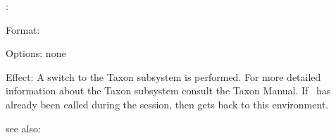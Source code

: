 \colab{} \taxon:

Format: 

Options: none

Effect: A switch to the Taxon subsystem is performed. For more 
        detailed information about the Taxon subsystem consult the 
        Taxon Manual. 
	If \taxon \ has already been called during the \COLAB{} 
        session, then \COLAB{} gets back to this environment.
       
see also: \colab
